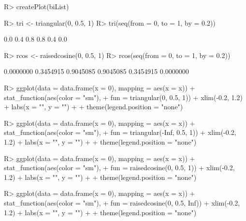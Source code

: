 \documentclass{article}\usepackage[]{graphicx}\usepackage[]{color}
\begin{document}
\begin{Schunk}
\begin{Sinput}
R> createPlot(biList)
\end{Sinput}
\end{Schunk}

\begin{Schunk}
% --begin: "triangular"
\begin{Sinput}
R> tri <- triangular(0, 0.5, 1)
R> tri(seq(from = 0, to = 1, by = 0.2))
\end{Sinput}
\begin{Soutput}
[1] 0.0 0.4 0.8 0.8 0.4 0.0
\end{Soutput}
\begin{Sinput}
R> rcos <- raisedcosine(0, 0.5, 1)
R> rcos(seq(from = 0, to = 1, by = 0.2))
\end{Sinput}
\begin{Soutput}
[1] 0.0000000 0.3454915 0.9045085 0.9045085 0.3454915 0.0000000
\end{Soutput}
%
% --end: "triangular"
\end{Schunk}

\begin{Schunk}
\begin{Sinput}
R> ggplot(data = data.frame(x = 0), mapping = aes(x = x)) + stat_function(aes(color = "sm"), 
+      fun = triangular(0, 0.5, 1)) + xlim(-0.2, 1.2) + labs(x = "", y = "") + 
+      theme(legend.position = "none")
\end{Sinput}
\end{Schunk}

\begin{Schunk}
\begin{Sinput}
R> ggplot(data = data.frame(x = 0), mapping = aes(x = x)) + stat_function(aes(color = "sm"), 
+      fun = triangular(-Inf, 0.5, 1)) + xlim(-0.2, 1.2) + labs(x = "", y = "") + 
+      theme(legend.position = "none")
\end{Sinput}
\end{Schunk}

\begin{Schunk}
\begin{Sinput}
R> ggplot(data = data.frame(x = 0), mapping = aes(x = x)) + stat_function(aes(color = "sm"), 
+      fun = raisedcosine(0, 0.5, 1)) + xlim(-0.2, 1.2) + labs(x = "", y = "") + 
+      theme(legend.position = "none")
\end{Sinput}
\end{Schunk}

\begin{Schunk}
\begin{Sinput}
R> ggplot(data = data.frame(x = 0), mapping = aes(x = x)) + stat_function(aes(color = "sm"), 
+      fun = raisedcosine(0, 0.5, Inf)) + xlim(-0.2, 1.2) + labs(x = "", y = "") + 
+      theme(legend.position = "none")
\end{Sinput}
\end{Schunk}
\end{document}
